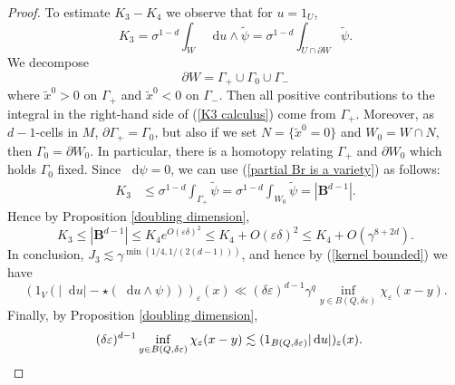 \documentclass[reqno,10pt]{amsart}
\newcommand{\Ball}{\mathbf{B}}
\newcommand*\dif{\mathop{}\!\mathrm{d}}
\theoremstyle{definition}
\numberwithin{equation}{section}
\begin{document}
\begin{proof}
To estimate $K_3 - K_4$ we observe that for $u = 1_U$,
\begin{equation}\label{K3 calculus}
K_3 = \sigma^{1 - d} \int_W \dif u \wedge \tilde \psi = \sigma^{1 - d} \int_{U \cap \partial W} \tilde \psi.
\end{equation}
We decompose
$$\partial W = \Gamma_+ \cup \Gamma_0 \cup \Gamma_-$$
where $\tilde x^0 > 0$ on $\Gamma_+$ and $\tilde x^0 < 0$ on $\Gamma_-$. Then all positive contributions to the integral in the right-hand side of (\ref{K3 calculus}) come from $\Gamma_+$.
Moreover, as $d-1$-cells in $M$, $\partial \Gamma_+ = \Gamma_0$, but also if we set $N = \{\tilde x^0 = 0\}$ and $W_0 = W \cap N$, then $\Gamma_0 = \partial W_0$.
In particular, there is a homotopy relating $\Gamma_+$ and $\partial W_0$ which holds $\Gamma_0$ fixed.
Since $\dif \psi = 0$, we can use (\ref{partial Br is a variety}) as follows:
\begin{align*}
K_3 &\leq \sigma^{1 - d} \int_{\Gamma_+} \tilde \psi = \sigma^{1 - d} \int_{W_0} \tilde \psi = |\Ball^{d - 1}|.
\end{align*}
Hence by Proposition \ref{doubling dimension},
$$K_3 \leq |\Ball^{d - 1}| \leq K_4 e^{O(\varepsilon\delta)^2} \leq K_4 + O(\varepsilon\delta)^2 \leq K_4 + O(\gamma^{8 + 2d}).$$
In conclusion, $J_3 \lesssim \gamma^{\min(1/4, 1/(2(d - 1)))}$, and hence by (\ref{kernel bounded}) we have
$$(1_V(|\dif u| - \star(\dif u \wedge \psi)))_\varepsilon(x) \ll (\delta\varepsilon)^{d - 1} \gamma^q \inf_{y \in B(Q, \delta\varepsilon)} \chi_\varepsilon(x - y).$$
Finally, by Proposition \ref{doubling dimension},
\begin{align*}
(\delta\varepsilon)^{d - 1} \inf_{y \in B(Q, \delta\varepsilon)} \chi_\varepsilon(x - y) &\lesssim (1_{B(Q, \delta\varepsilon)} |\dif u|)_\varepsilon(x). \qedhere
\end{align*}
\end{proof}
\end{document}
